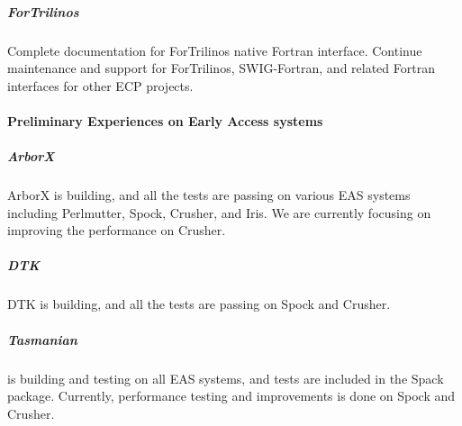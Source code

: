 \subparagraph{ForTrilinos} Complete documentation for ForTrilinos native Fortran
interface. Continue maintenance and support for ForTrilinos, SWIG-Fortran, and
related Fortran interfaces for other ECP projects.


\paragraph{Preliminary Experiences on Early Access systems}

\subparagraph{ArborX} ArborX is building, and all the tests are passing on various EAS systems including Perlmutter, Spock, Crusher, and Iris. We are currently focusing on improving the performance on Crusher.

\subparagraph{DTK} DTK is building, and all the tests are passing on Spock and Crusher.

\subparagraph{Tasmanian} is building and testing on all EAS systems, and tests are included in the Spack package. Currently, performance testing and improvements is done on Spock and Crusher.


